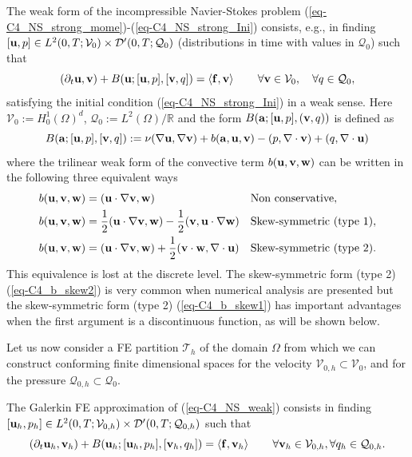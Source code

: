 The weak form of the incompressible Navier-Stokes problem (\ref{eq-C4_NS_strong_mome})-(\ref{eq-C4_NS_strong_Ini}) consists, e.g., in finding $[{\bf u},p]\in {L}^2(0,T;\mathcal{V}_0)\times {\cal D}'(0,T;\mathcal{Q}_0)$ (distributions in time with values in $\mathcal{Q}_0$) such that
\begin{equation}
\label{eq-C4_NS_weak}
(\partial_t{\bf u},{\bf v}) + B({\bf u};[{\bf u},p],[{\bf v},q]) = \left<{\bf f},{\bf v}\right> 
\quad\quad\forall{\bf v}\in\mathcal{V}_0,\quad\forall q\in\mathcal{Q}_0,
\end{equation}
satisfying the initial condition (\ref{eq-C4_NS_strong_Ini}) in a weak sense. Here $\mathcal{V}_0:={H}_0^1(\Omega)^d$, $\mathcal{Q}_0:=L^2(\Omega)/\mathbb{R}$ and the form $B({{\bf a}};[{\bf u},p],({\bf v},q))$ is defined as 
\begin{equation}
\label{eq-C4_bilinear}
B({\bf a};[{\bf u},p],[{\bf v},q]):=\nu(\nabla{\bf u},\nabla{\bf v})+b({\bf a},{\bf u},{\bf v})-(p,\nabla\cdot{\bf v})+(q,\nabla\cdot{\bf u})
\end{equation}
where the trilinear weak form of the convective term $b({\bf u},{\bf v},{\bf w})$ can be written in the following three equivalent ways
\begin{align}
\label{eq-C4_b_noskew}
&b({\bf u},{\bf v},{\bf w})=({\bf u}\cdot\nabla{\bf v},{\bf w})&&\mbox{Non conservative},\\
\label{eq-C4_b_skew1}
&b({\bf u},{\bf v},\mathbf{w})=\frac{1}{2}({\bf u}\cdot\nabla{\bf v},\mathbf{w})-\frac{1}{2}({\bf v},{\bf u}\cdot\nabla\mathbf{w})&&\mbox{Skew-symmetric (type 1)},\\
\label{eq-C4_b_skew2}
&b({\bf u},{\bf v},\mathbf{w})=({\bf u}\cdot\nabla{\bf v},\mathbf{w})+\frac{1}{2}({\bf v}\cdot\mathbf{w},\nabla\cdot{\bf u})&&\mbox{Skew-symmetric (type 2)}.
\end{align}
This equivalence is lost at the discrete level. The skew-symmetric form (type 2) (\ref{eq-C4_b_skew2}) is very common when numerical analysis are presented \cite{badia_convergence_2014,burman_galerkin_2009,guermond_faedogalerkin_2007} but the skew-symmetric form (type 2) (\ref{eq-C4_b_skew1}) has important advantages when the first argument is a discontinuous function, as will be shown below.

Let us now consider a FE partition $\mathcal{T}_h$ of the domain $\Omega$ from which we can construct conforming finite dimensional spaces for the velocity $\mathcal{V}_{0,h} \subset \mathcal{V}_0$, and for the pressure $\mathcal{Q}_{0,h}\subset \mathcal{Q}_0$. 

The Galerkin FE approximation of (\ref{eq-C4_NS_weak}) consists in finding $[{\bf u}_h,p_h]\in {L}^2(0,T;\mathcal{V}_{0,h})\times {\cal D}'(0,T;\mathcal{Q}_{0,h})$ such that
\begin{equation}
\label{eq-C4_NS_galerkin}
(\partial_t{\bf u}_h,{\bf v}_h) + B({\bf u}_h;[{\bf u}_h,p_h],[{\bf v}_h,q_h]) =\left<{\bf f},{\bf v}_h\right>
\quad\quad\forall{\bf v}_h\in\mathcal{V}_{0,h},\forall q_h\in\mathcal{Q}_{0,h}.
\end{equation}

